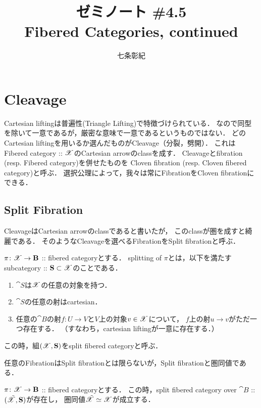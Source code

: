 \documentclass[a4paper, dvipdfmx]{jsarticle}
\begin{document}
\title{ゼミノート \#4.5 \\ Fibered Categories, continued}
\author{七条彰紀}
\maketitle

\section{Cleavage}
    Cartesian liftingは普遍性(Triangle Lifting)で特徴づけられている．
    なので同型を除いて一意であるが，厳密な意味で一意であるというものではない．
    どのCartesian liftingを用いるか選んだものがCleavage（分裂，劈開）．
    これはFibered category :: $\mathscr{X}$のCartesian arrowのclassを成す．
    Cleavageとfibration (resp. Fibered category)を併せたものを
    Cloven fibration (resp. Cloven fibered category)と呼ぶ．
    選択公理によって，我々は常にFibrationをCloven fibrationにできる．

\subsection{ Split Fibration }
    CleavageはCartesian arrowのclassであると書いたが，
    このclassが圏を成すと綺麗である．
    そのようなCleavageを選べるFibrationをSplit fibrationと呼ぶ．

    \begin{Def}
        $\pi \colon \mathscr{X} \to \mathbf{B}$ :: fibered categoryとする．
        splitting of $\pi$とは，以下を満たすsubcategory :: $\mathbf{S} \subset \mathscr{X}$のことである．
        \begin{enumerate}
            \item
                $\cat{S}$は$\mathscr{X}$の任意の対象を持つ．
            \item
                $\cat{S}$の任意の射はcartesian．
            \item
                任意の$\cat{B}$の射$f \colon U \to V$と$V$上の対象$v \in \mathscr{X}$について，
                $f$上の射$u \to v$がただ一つ存在する．
                （すなわち，cartesian liftingが一意に存在する．）
        \end{enumerate}
        この時，組$(\mathscr{X}, \mathbf{S})$をsplit fibered categoryと呼ぶ．
    \end{Def}

    任意のFibrationはSplit fibrationとは限らないが，Split fibrationと圏同値である．

    \begin{Thm}
        $\pi \colon \mathscr{X} \to \mathbf{B}$ :: fibered categoryとする．
        この時，split fibered category over $\cat{B}$ :: $(\tilde{\mathscr{X}}, \mathbf{S})$が存在し，
        圏同値$\tilde{\mathscr{X}} \overset{{}}{\simeq} \mathscr{X}$が成立する．
    \end{Thm}
\end{document}
